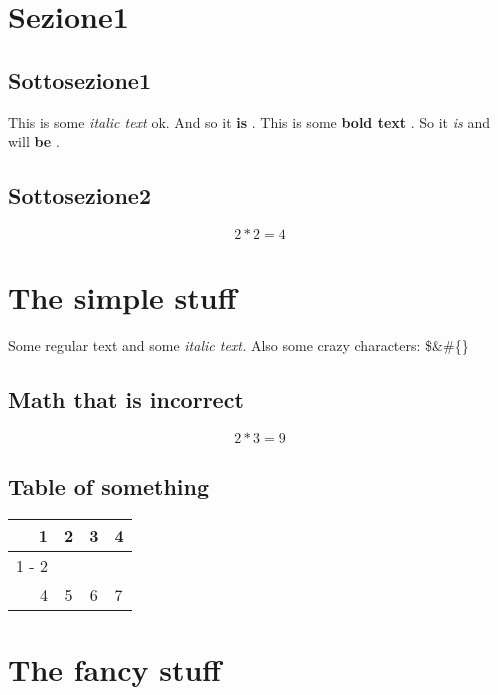 \documentclass{article}%
\begin{document}
%
\normalsize%
\section{Sezione1}%
\label{sec:Sezione1}%

%
\subsection{Sottosezione1}%
\label{subsec:Sottosezione1}%

%
This is some %
\textit{italic text}%
\hspace{1pt} %
 ok. And so it %
\textbf{is}%
.%
\newline%
%
This is some %
\textbf{bold text}%
. So it %
\textit{is}%
\hspace{1pt} %
 and will %
\textbf{be}%
.%
\newline%
%
\subsection{Sottosezione2}%
\label{subsec:Sottosezione2}%

%
\[%
2*2 = 4%
\]%
\section{The simple stuff}%
\label{sec:Thesimplestuff}%
Some regular text and some %
\textit{italic text.}%
\newline%
Also some crazy characters: \$\&\#\{\}%
\subsection{Math that is incorrect}%
\label{subsec:Maththatisincorrect}%
\[%
2*3 = 9%
\]

%
\subsection{Table of something}%
\label{subsec:Tableofsomething}%
\begin{tabular}{rc|cl}%
\hline%
1&2&3&4\\%
\cline{1%
-%
2}%
&&&\\%
4&5&6&7\\%
\end{tabular}

%
\section{The fancy stuff}%
\label{sec:Thefancystuff}%
\end{document}
